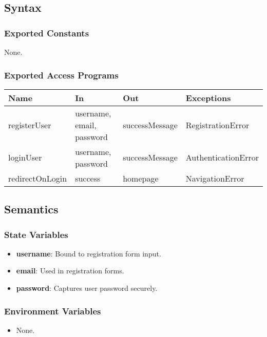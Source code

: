 \documentclass[12pt, titlepage]{article}
\begin{document}
\subsection{Syntax}

\subsubsection{Exported Constants}
None.

\subsubsection{Exported Access Programs}

\begin{center}
  \begin{tabular}{|p{4cm}|p{4cm}|p{4cm}|p{4cm}|}
    \hline
    \textbf{Name} & \textbf{In} & \textbf{Out} & \textbf{Exceptions} \\
    \hline
    registerUser & username, email, password & successMessage & RegistrationError \\
    \hline
    loginUser & username, password & successMessage & AuthenticationError \\
    \hline
    redirectOnLogin & success & homepage & NavigationError \\
    \hline
  \end{tabular}
\end{center}

\subsection{Semantics}

\subsubsection{State Variables}
\begin{itemize}
    \item \textbf{username}: Bound to registration form input.
    \item \textbf{email}: Used in registration forms.
    \item \textbf{password}: Captures user password securely.
\end{itemize}

\subsubsection{Environment Variables}
\begin{itemize}
    \item None.
\end{itemize}
\end{document}
